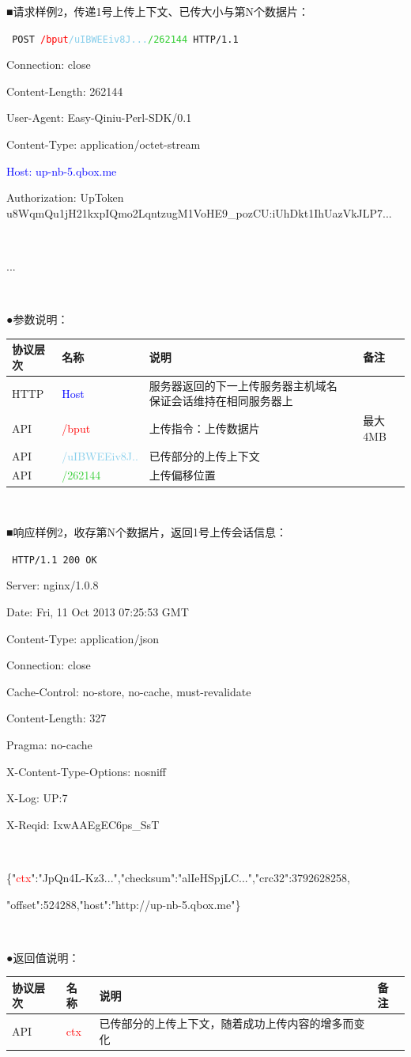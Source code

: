 \documentclass[11pt, oneside]{book}
\newcommand{\qpara}[1]{
\vspace{0.2em}
\begin{spacing}{1.35}
\noindent
#1\par
\end{spacing}
\vspace{0.2em}
}
\newcommand{\qblock}[1]{
\vspace{0.1em}
\noindent
#1\par
\vspace{0.1em}
}
\newcommand{\qtable}[1]{\footnotesize\vspace{0.5em}#1\vspace{0.5em}\normalsize}
\newcommand{\qhttp}[1]{\noindent #1\par}
\begin{document}
\qblock{■\thinspace 请求样例2，传递1号上传上下文、已传大小与第N个数据片：}
{
\tt \footnotesize
\qhttp{POST \textcolor{red}{/bput}\textcolor{SkyBlue}{/uIBWEEiv8J...}\textcolor{LimeGreen}{/262144} HTTP/1.1}
\qhttp{Connection: close}
\qhttp{Content-Length: 262144}
\qhttp{User-Agent: Easy-Qiniu-Perl-SDK/0.1}
\qhttp{Content-Type: application/octet-stream}
\qhttp{\textcolor{blue}{Host: up-nb-5.qbox.me}}
\qhttp{Authorization: UpToken u8WqmQu1jH21kxpIQmo2LqntzugM1VoHE9\_pozCU:iUhDkt1IhUazVkJLP7...}
\qhttp{\ }
\qhttp{...}
\qhttp{\ }
}

\qblock{●\thinspace 参数说明：}
\qtable{
\def\arraystretch{2}
\begin{tabular}{|l|p{9em}|p{17em}|p{7em}|}
\hline
协议层次 & 名称 & 说明 & 备注 \\
\hline
HTTP & \textcolor{blue}{Host} & 服务器返回的下一上传服务器主机域名 \newline 保证会话维持在相同服务器上 & \\
\hline
API & \textcolor{red}{/bput} & 上传指令：上传数据片 & 最大4MB \\
\hline
API & \textcolor{SkyBlue}{/uIBWEEiv8J..} & 已传部分的上传上下文 & \\
\hline
API & \textcolor{LimeGreen}{/262144} & 上传偏移位置 & \\
\hline
\end{tabular}
}

\qpara{\ }

\qblock{■\thinspace 响应样例2，收存第N个数据片，返回1号上传会话信息：}
{
\tt \footnotesize
\qhttp{HTTP/1.1 200 OK}
\qhttp{Server: nginx/1.0.8}
\qhttp{Date: Fri, 11 Oct 2013 07:25:53 GMT}
\qhttp{Content-Type: application/json}
\qhttp{Connection: close}
\qhttp{Cache-Control: no-store, no-cache, must-revalidate}
\qhttp{Content-Length: 327}
\qhttp{Pragma: no-cache}
\qhttp{X-Content-Type-Options: nosniff}
\qhttp{X-Log: UP:7}
\qhttp{X-Reqid: IxwAAEgEC6ps\_SsT}
\qhttp{\ }
\qhttp{\{"\textcolor{red}{ctx}":"JpQn4L-Kz3...","checksum":"alIeHSpjLC...","crc32":3792628258,}
\qhttp{"offset":524288,"host":"http://up-nb-5.qbox.me"\}}
\qhttp{\ }
}

\qblock{●\thinspace 返回值说明：}
\qtable{
\def\arraystretch{2}
\begin{tabular}{|l|p{9em}|p{17em}|p{7em}|}
\hline
协议层次 & 名称 & 说明 & 备注 \\
\hline
API & \textcolor{red}{ctx} & 已传部分的上传上下文，随着成功上传内容的增多而变化 & \\
\hline
\end{tabular}
}
\end{document}
